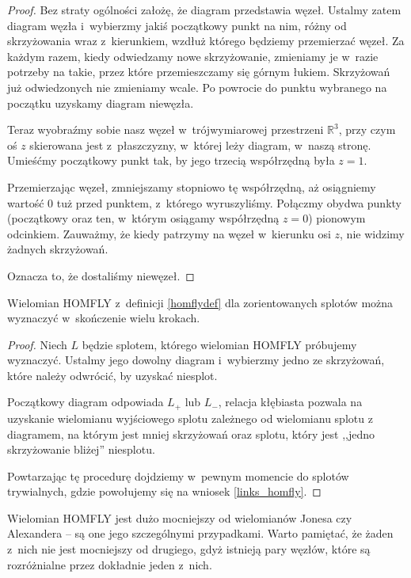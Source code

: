 \begin{proof}
Bez straty ogólności założę, że diagram przedstawia węzeł.
Ustalmy zatem diagram węzła i~wybierzmy jakiś początkowy punkt na nim, różny od skrzyżowania wraz z~kierunkiem, wzdłuż którego będziemy przemierzać węzeł.
Za każdym razem, kiedy odwiedzamy nowe skrzyżowanie, zmieniamy je w~razie potrzeby na takie, przez które przemieszczamy się górnym łukiem.
Skrzyżowań już odwiedzonych nie zmieniamy wcale.
Po powrocie do punktu wybranego na początku uzyskamy diagram niewęzła.

Teraz wyobraźmy sobie nasz węzeł w~trójwymiarowej przestrzeni $\mathbb R^3$, przy czym oś $z$ skierowana jest z~płaszczyzny, w~której leży diagram, w~naszą stronę.
Umieśćmy początkowy punkt tak, by jego trzecią współrzędną była $z = 1$.

Przemierzając węzeł, zmniejszamy stopniowo tę współrzędną, aż osiągniemy wartość $0$ tuż przed punktem, z~którego wyruszyliśmy.
Połączmy obydwa punkty (początkowy oraz ten, w~którym osiągamy współrzędną $z = 0$) pionowym odcinkiem.
Zauważmy, że kiedy patrzymy na węzeł w~kierunku osi $z$, nie widzimy żadnych skrzyżowań.

Oznacza to, że dostaliśmy niewęzeł.
\end{proof}

\begin{proposition}
    Wielomian HOMFLY z~definicji \ref{homflydef} dla zorientowanych splotów można wyznaczyć w~skończenie wielu krokach.
\end{proposition}

\begin{proof}
    Niech $L$ będzie splotem, którego wielomian HOMFLY próbujemy wyznaczyć.
    Ustalmy jego dowolny diagram i~wybierzmy jedno ze skrzyżowań, które należy odwrócić, by uzyskać niesplot.

    Początkowy diagram odpowiada $L_+$ lub $L_-$, relacja kłębiasta pozwala na uzyskanie wielomianu wyjściowego splotu zależnego od wielomianu splotu z
    diagramem, na którym jest mniej skrzyżowań oraz splotu, który jest ,,jedno skrzyżowanie bliżej'' niesplotu.

    Powtarzając tę procedurę dojdziemy w~pewnym momencie do splotów trywialnych, gdzie powołujemy się na wniosek \ref{links_homfly}.
\end{proof}

Wielomian HOMFLY jest dużo mocniejszy od wielomianów Jonesa czy Alexandera -- są one jego szczególnymi przypadkami.
Warto pamiętać, że żaden z~nich nie jest mocniejszy od drugiego, gdyż istnieją pary węzłów, które są rozróżnialne przez dokładnie jeden z~nich.

